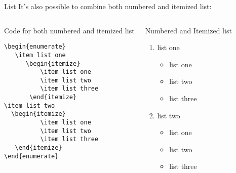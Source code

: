 \documentclass[10pt,xcolor=x11names]{beamer}
\begin{document}
\begin{frame}{List}
\vspace{8pt}
It's also possible to combine both numbered and itemized list: 

{\footnotesize 
\begin{columns}[t]
	\begin{exampleblock}{Code for both numbered and itemized list }
		\begin{verbatim}
\begin{enumerate}
   \item list one 
      \begin{itemize}
          \item list one 
          \item list two 
          \item list three 
       \end{itemize}      
\item list two 
  \begin{itemize}
          \item list one 
          \item list two 
          \item list three 
   \end{itemize}
\end{enumerate}
		\end{verbatim}
	\end{exampleblock}
	
	
	\begin{exampleblock}{Numbered and Itemized list }
		
		\begin{enumerate}
			\item list one 
			
			\begin{itemize}
				\item list one 
				\item list two 
				\item list three 
			\end{itemize}
			\item list two 
			\begin{itemize}
				\item list one 
				\item list two 
				\item list three 
			\end{itemize}
		\end{enumerate}
		
	\end{exampleblock}
\end{columns}

}
\end{frame}
\end{document}
